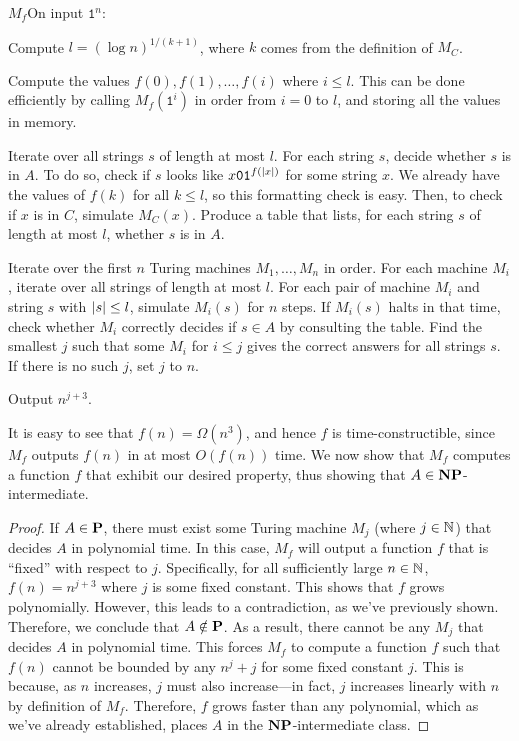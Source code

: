 \documentclass[11pt,twoside=off,numbers=noenddot]{scrbook}
\begin{document}
\begin{turing}{$M_f$}{On input $\texttt{1}^n$:}
\item Compute $l = (\log n)^{1 / (k + 1)}$, where $k$ comes from the definition of $M_C$.
\item Compute the values $f(0), f(1), \dots, f(i)$ where $i \leq l$. This can be done efficiently by calling $M_f(\texttt{1}^i)$ in order from $i = 0$ to $l$, and storing all the values in memory.
\item Iterate over all strings $s$ of length at most $l$. For each string $s$, decide whether $s$ is in $A$. To do so, check if $s$ looks like $x\texttt{0}\texttt{1}^{f(| x |)}$ for some string $x$. We already have the values of $f(k)$ for all $k \leq l$, so this formatting check is easy. Then, to check if $x$ is in $C$, simulate $M_C(x)$. Produce a table that lists, for each string $s$ of length at most $l$, whether $s$ is in $A$.
\item Iterate over the first $n$ Turing machines $M_1, \dots, M_n$ in order. For each machine $M_i$, iterate over all strings of length at most $l$. For each pair of machine $M_i$ and string $s$ with $| s | \leq l$, simulate $M_i(s)$ for $n$ steps. If $M_i(s)$ halts in that time, check whether $M_i$ correctly decides if $s \in A$ by consulting the table. Find the smallest $j$ such that some $M_i$ for $i \leq j$ gives the correct answers for all strings $s$. If there is no such $j$, set $j$ to $n$.
\item Output $n^{j + 3}$.
\end{turing}

It is easy to see that $f(n) = \Omega(n^3)$, and hence $f$ is time-constructible, since $M_f$ outputs $f(n)$ in at most $O(f(n))$ time. We now show that $M_f$ computes a function $f$ that exhibit our desired property, thus showing that $A \in \textbf{NP}$-intermediate.

\begin{proof}
  If $A \in \textbf{P}$, there must exist some Turing machine $M_j$ (where $j \in \mathbb N$) that decides $A$ in polynomial time. In this case, $M_f$ will output a function $f$ that is ``fixed'' with respect to $j$. Specifically, for all sufficiently large $n \in \mathbb N$, $f(n) = n^{j + 3}$ where $j$ is some fixed constant. This shows that $f$ grows polynomially. However, this leads to a contradiction, as we've previously shown. Therefore, we conclude that $A \notin \textbf{P}$. As a result, there cannot be any $M_j$ that decides $A$ in polynomial time. This forces $M_f$ to compute a function $f$ such that $f(n)$ cannot be bounded by any $n^j + j$ for some fixed constant $j$. This is because, as $n$ increases, $j$ must also increase—in fact, $j$ increases linearly with $n$ by definition of $M_f$. Therefore, $f$ grows faster than any polynomial, which as we've already established, places $A$ in the $\textbf{NP}$-intermediate class.
\end{proof}
\end{document}
